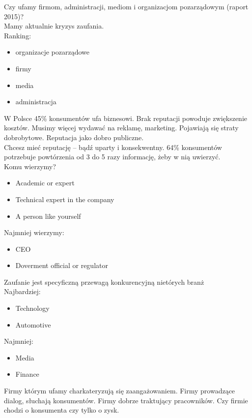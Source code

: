 \documentclass[a4paper,10pt]{report}
\begin{document}
Czy ufamy firmom, administracji, mediom i organizacjom pozarządowym (raport 2015)?\\
Mamy aktualnie kryzys zaufania.\\

Ranking:
\begin{itemize}
	\item organizacje pozarządowe
	\item firmy
	\item media 
	\item administracja
\end{itemize}

W Polsce 45\% konsumentów ufa biznesowi. Brak reputacji powoduje zwiększenie kosztów. Musimy więcej wydawać na reklamę, marketing. Pojawiają się straty dobrobytowe. Reputacja jako dobro publiczne.\\

Chcesz mieć reputację -- bądź uparty i konsekwentny. 64\% konsumentów potrzebuje powtórzenia od 3 do 5 razy informację, żeby w nią uwierzyć.\\

Komu wierzymy? 
\begin{itemize}
	\item Academic or expert
	\item Technical expert in the company
	\item A person like yourself
\end{itemize}

Najmniej wierzymy:
\begin{itemize}
	\item CEO
	\item Doverment official or regulator
\end{itemize}

Zaufanie jest specyficzną przewagą konkurencyjną nietórych branż\\
Najbardziej:
\begin{itemize}
	\item Technology
	\item Automotive
\end{itemize}
Najmniej:
\begin{itemize}
	\item Media
	\item Finance
\end{itemize}

Firmy którym ufamy charkateryzują się zaangażowaniem. Firmy prowadzące dialog, słuchają konsumentów. Firmy dobrze traktujący pracowników. Czy firmie chodzi o konsumenta czy tylko o zysk.	\\
\end{document}
